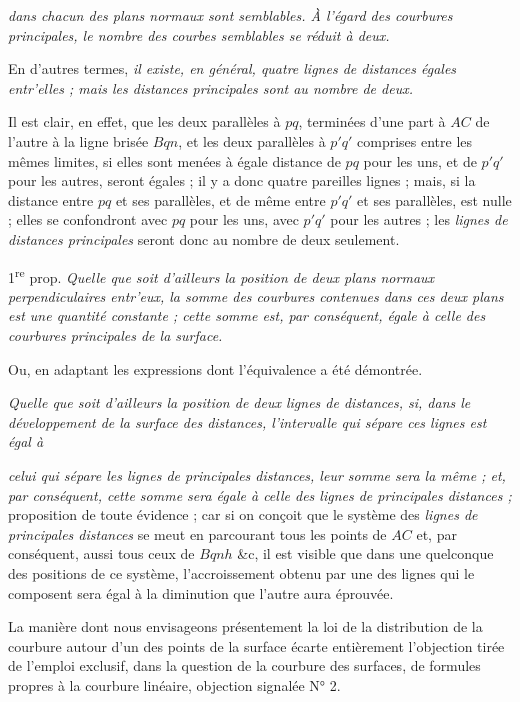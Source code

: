 \documentclass[11pt,a4paper]{article}
\begin{document}
\emph{dans chacun des plans normaux sont semblables. À l'égard des courbures
principales, le nombre des courbes semblables se réduit à deux.}

En d'autres termes, \emph{il existe, en général, quatre lignes de distances
égales entr'elles ; mais les distances principales sont au nombre de deux.}

Il est clair, en effet, que les deux parallèles à $pq$, terminées d'une part
à $AC$ de l'autre à la ligne brisée $Bqn$, et les deux parallèles à $p'q'$
comprises entre les mêmes limites, si elles sont menées à égale distance de
$pq$ pour les uns, et de $p'q'$ pour les autres, seront égales ; il y a donc
quatre pareilles lignes ; mais, si la distance entre $pq$ et ses parallèles,
et de même entre $p'q'$ et ses parallèles, est nulle ; elles se confondront
avec $pq$ pour les uns, avec $p'q'$ pour les autres ; les \emph{lignes de
distances principales} seront donc au nombre de deux seulement.

1\textsuperscript{re} prop. \emph{Quelle que soit d'ailleurs la position de deux
plans normaux perpendiculaires entr'eux, la somme des courbures contenues
dans ces deux plans est une quantité constante ; cette somme est, par
conséquent, égale à celle des courbures principales de la surface.}

Ou, en adaptant les expressions dont l'équivalence a été démontrée.

\emph{Quelle que soit d'ailleurs la position de deux lignes de distances,
si, dans le développement de la surface des distances, l'intervalle qui
sépare ces lignes est égal à}

\emph{celui qui sépare les lignes de principales distances, leur somme sera
la même ; et, par conséquent, cette somme sera égale à celle des lignes de
principales distances ;} proposition de toute évidence ; car si on conçoit
que le système des \emph{lignes de principales distances} se meut en
parcourant tous les points de $AC$ et, par conséquent, aussi tous ceux de
$Bqnh$ \&c, il est visible que dans une quelconque des positions de ce
système, l'accroissement obtenu par une des lignes qui le composent sera
égal à la diminution que l'autre aura éprouvée.

La manière dont nous envisageons présentement la loi de la distribution de
la courbure autour d'un des points de la surface écarte entièrement
l'objection tirée de l'emploi exclusif, dans la question de la courbure des
surfaces, de formules propres à la courbure linéaire, objection signalée
N° 2.
\end{document}
